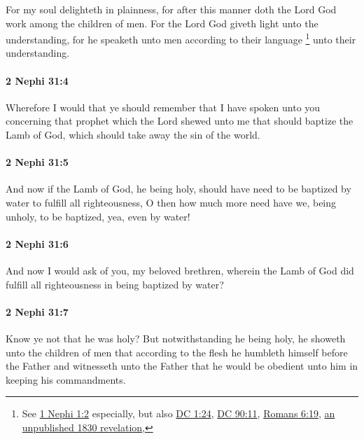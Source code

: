 			For my soul delighteth in plainness,
			for after this manner doth the Lord God work among the children of men.
			For the Lord God giveth light unto the understanding,
			for he speaketh unto men according to their language%
				\footnote{%
					See \hyperref[1NEPHI-1-2]{1 Nephi 1:2} especially, but also \hyperref[DC1-24]{DC 1:24}, \hyperref[DC90-11]{DC 90:11}, \hyperref[ROMANS-6-19]{Romans 6:19}, \hyperlink{EMS-1830-JS-CIR-EARLY-1830-d}{an unpublished 1830 revelation}, 
					}
			unto their understanding.

		\paragraph{2 Nephi 31:4} %
			\label{2NEPHI-31-4}

			Wherefore I would that ye should remember that I have spoken unto you
			concerning that prophet which the Lord shewed unto me
			that should baptize the Lamb of God,
			which should take away the sin of the world.

		\paragraph{2 Nephi 31:5} %
			\label{2NEPHI-31-5}

			And now if the Lamb of God, he being holy, should have need
			to be baptized by water to fulfill all righteousness,
			O then how much more need have we, being unholy,
			to be baptized, yea, even by water!

		\paragraph{2 Nephi 31:6} %
			\label{2NEPHI-31-6}

			And now I would ask of you, my beloved brethren,
			wherein the Lamb of God did fulfill all righteousness in being baptized by water?

		\paragraph{2 Nephi 31:7} %
			\label{2NEPHI-31-7}

			Know ye not that he was holy?
			But notwithstanding he being holy,
			he showeth unto the children of men
			that according to the flesh he humbleth himself before the Father
			and witnesseth unto the Father
			that he would be obedient unto him in keeping his commandments.

